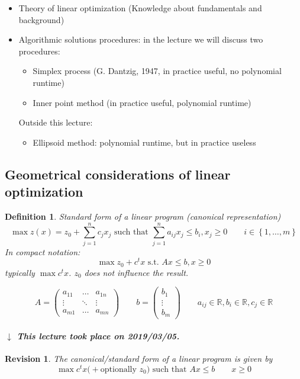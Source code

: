 \documentclass[a4paper]{article}
\numberwithin{lecref}{subsection}
\newtheorem*{Definition}{Definition}
\newtheorem*{Revision}{Revision}
\newcommand{\Set}[1]{\left\{#1\right\}}
\newcommand{\dateref}[1]{%
  \begin{mdframed}[backgroundcolor=gray!10,innerbottommargin=0pt,innertopmargin=0pt]
    \paragraph{\textit{$\downarrow$ This lecture took place on #1.}}%
  \end{mdframed}%
}
\begin{document}
\begin{itemize}
	\item Theory of linear optimization (Knowledge about fundamentals and background)
	\item Algorithmic solutions procedures: in the lecture we will discuss two procedures:
		\begin{itemize}
			\item Simplex process (G. Dantzig, 1947, in practice useful, no polynomial runtime)
			\item Inner point method (in practice useful, polynomial runtime)
		\end{itemize}
		Outside this lecture:
		\begin{itemize}
			\item Ellipsoid method: polynomial runtime, but in practice useless
		\end{itemize}
\end{itemize}

\subsection{Geometrical considerations of linear optimization}

\begin{Definition}
  Standard form of a linear program (canonical representation)
  \[ \max{z(x)} = z_0 + \sum_{j=1}^n c_j x_j \text{ such that } \sum_{j=1}^n a_{ij} x_j \leq b_i, x_j \geq 0 \qquad i \in \Set{1, \dots, m} \]
  In compact notation:
  \[ \max{z_0 + c^t x} \text{ s.t. } Ax \leq b, x \geq 0 \]
  typically $\max c^t x$.
  $z_0$ does not influence the result.

  \[ A = \begin{pmatrix} a_{11} & \dots & a_{1n} \\ \vdots & \ddots & \vdots \\ a_{m1} & \dots & a_{mn} \end{pmatrix} \qquad b = \begin{pmatrix} b_1 \\ \vdots \\ b_m \end{pmatrix} \qquad a_{ij} \in \mathbb R, b_i \in \mathbb R, c_j \in \mathbb R \]
\end{Definition}

\dateref{2019/03/05}

\begin{Revision}
	The canonical/standard form of a linear program is given by
	\[ \max c^t x \text{(} + \text{optionally } z_0 \text{) such that } Ax \leq b \qquad x \geq 0 \]
\end{Revision}
\end{document}
